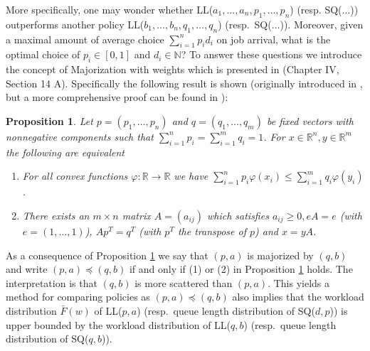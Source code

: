 \documentclass[12pt]{report}
\newcommand{\R}{\mathbb{R}}
\newtheorem{proposition}[theorem]{Proposition}
\begin{document}
More specifically, one may wonder whether LL($a_1,\dots,a_n,p_1,\dots,p_n$) (resp. SQ($\dots$)) outperforms another policy LL($b_1,\dots,b_n,q_1,\dots,q_n$) (resp.~SQ($\dots$)). Moreover, given a maximal amount of average choice $\sum_{i=1}^n p_i d_i$ on job arrival, what is the optimal choice of $p_i \in [0,1]$ and $d_i \in \mathbb{N}$? To answer these questions we introduce the concept of Majorization with weights which is presented in \cite{marshall1979inequalities} (Chapter IV, Section 14 A). Specifically the following result is shown (originally introduced in \cite{blackwell1951range}, but a more comprehensive proof can be found in \cite{borcea2007equilibrium}):
\begin{proposition}\label{prop:majorization}
Let $p=(p_1,\dots,p_n)$ and $q=(q_1,\dots,q_m)$ be fixed vectors with nonnegative components such that $\sum_{i=1}^n p_i = \sum_{i=1}^m q_i = 1$. For $x \in \R^n, y \in \R^m$ the following are equivalent
\begin{enumerate}[label={(\arabic*)}]
\item For all convex functions $\varphi:\R\rightarrow \R$ we have $\sum_{i=1}^n p_i \varphi(x_i) \leq \sum_{i=1}^m q_i \varphi(y_i)$.
\item There exists an $m \times n$ matrix $A = (a_{ij})$ which satisfies $a_{ij} \geq 0, eA=e$ (with $e=(1,\dots,1)$), $A p^T = q^T$ (with $p^T$ the transpose of $p$) and $x=yA$. \label{enum:major_2}
\end{enumerate}
\end{proposition}

As a consequence of Proposition \ref{prop:majorization} we say that $(p,a)$ is majorized by $(q,b)$ and write $(p,a) \preceq (q,b)$ if and only if (1) or (2) in Proposition \ref{prop:majorization} holds. The interpretation is that $(q,b)$ is more scattered than $(p,a)$.  This yields a method for comparing policies as $(p,a) \preceq (q,b)$ also implies that 
the workload distribution $\bar F(w)$ of LL($p,a$) (resp.~queue length distribution of SQ($d,p$)) is upper bounded by
the workload distribution of LL($q,b$) (resp.~queue length distribution of SQ($q,b$)).
\end{document}
